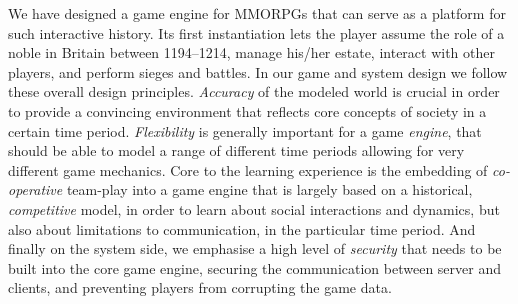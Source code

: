 \documentclass[11pt]{article}
\begin{document}
We have designed a game engine for  MMORPGs that can serve as a platform for such interactive history.
Its first instantiation  lets the player assume the role of a noble in Britain
between 1194--1214, manage his/her estate, interact with other players, and perform sieges and battles.
%
In our game and system design we follow these overall design principles. \emph{Accuracy\/}
of the modeled world is crucial in order to provide a convincing environment that reflects
core concepts of society in a certain time period. \emph{Flexibility} is generally important
for a  game \emph{engine}, that should be able to model a range of different time periods
allowing for very different game mechanics. Core to the learning experience is the embedding 
of \emph{co-operative} team-play into a game engine that is largely based on a historical, \emph{competitive} model,
in order to learn about social interactions and dynamics, but also about limitations to communication,
in the particular time period. And finally on the system side, we emphasise a high level
of \emph{security} that needs to be built into the core game engine, securing the communication 
between server and clients, and preventing players from corrupting the game data.


\end{document}
